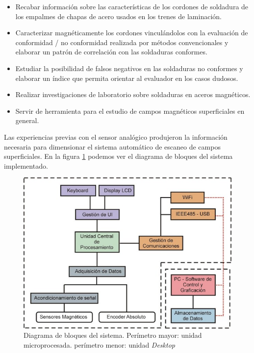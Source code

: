 \begin{itemize}
	\item Recabar información sobre las características de los cordones de soldadura de los empalmes de chapas de acero usados en los trenes de laminación. 
	
	\item Caracterizar magnéticamente los cordones vinculándolos con la evaluación de conformidad / no conformidad realizada por métodos convencionales y elaborar un patrón de correlación con las soldaduras conformes.
	\item Estudiar la posibilidad de falsos negativos en las soldaduras no conformes y elaborar un índice que permita orientar al evaluador en los casos dudosos.
	\item Realizar investigaciones de laboratorio sobre soldaduras en aceros magnéticos. 
	
	\item Servir de herramienta para el estudio de campos magnéticos superficiales en general.
\end{itemize}	

Las experiencias previas con el sensor analógico produjeron la información necesaria para dimensionar el sistema automático de escaneo de campos superficiales. En la figura \ref{fig:DiagramaBloquesSistema} podemos ver el diagrama de bloques del sistema implementado.

\begin{figure}[htpb]
    \centering
    \includegraphics[width=1.00\textwidth]{./Figures/CESE001x}
	\caption{Diagrama de bloques del sistema. Perímetro mayor: unidad microprocesada. perímetro menor: unidad \textit{Desktop}}
	\label{fig:DiagramaBloquesSistema}
 \end{figure}


